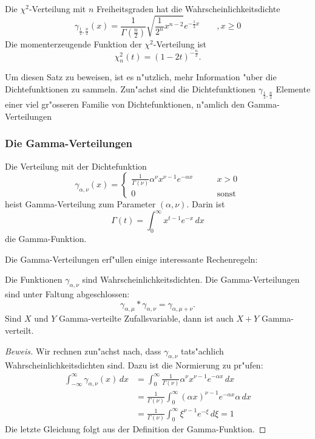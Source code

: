 {\small

\begin{satz}\label{chi2}
Die $\chi^2$-Verteilung mit $n$ Freiheitsgraden hat
die Wahrscheinlichkeitsdichte
\[
\gamma_{\frac12,\frac{n}2}(x)=\frac1{\Gamma(\frac{n}2)}\sqrt{\frac1{2^n}x^{n-2}}e^{-\frac12x}\qquad,x\ge 0
\]
Die momenterzeugende Funktion der $\chi^2$-Verteilung ist
\[
\chi_n^2(t)=(1-2t)^{-\frac{n}2}.
\]
\end{satz}

Um diesen Satz zu beweisen, ist es n"utzlich, mehr Information "uber die
Dichtefunktionen zu sammeln.
Zun"achst sind die Dichtefunktionen
$\gamma_{\frac12,\frac{n}2}$ Elemente einer viel gr"osseren Familie von
Dichtefunktionen, n"amlich den Gamma-Verteilungen

\subsubsection{Die Gamma-Verteilungen}
\begin{definition}
Die Verteilung mit der Dichtefunktion
\[
\gamma_{\alpha,\nu}(x)=\begin{cases}
\displaystyle \frac1{\Gamma(\nu)}\alpha^\nu x^{\nu-1}e^{-\alpha x}&\qquad x>0\\
0&\qquad\text{sonst}
\end{cases}
\]
heist Gamma-Verteilung zum Parameter $(\alpha,\nu)$.
Darin ist
\[
\Gamma(t)=\int_0^\infty x^{t-1}e^{-x}\,dx
\]
die Gamma-Funktion.
\end{definition}

Die Gamma-Verteilungen erf"ullen einige interessante Rechenregeln:
\begin{satz} Die Funktionen $\gamma_{\alpha,\nu}$ sind Wahrscheinlichkeitsdichten.
Die Gamma-Verteilungen sind unter Faltung abgeschlossen:
\[
\gamma_{\alpha,\mu}*\gamma_{\alpha,\nu}=\gamma_{\alpha,\mu+\nu}.
\]
Sind $X$ und $Y$ Gamma-verteilte Zufallsvariable, dann ist auch $X+Y$
Gamma-verteilt.
\end{satz}
\begin{proof}[Beweis]
Wir rechnen zun"achst nach, dass $\gamma_{\alpha,\nu}$ tats"achlich
Wahrscheinlichkeitsdichten sind.
Dazu ist die Normierung zu pr"ufen:
\begin{align*}
\int_{-\infty}^\infty \gamma_{\alpha,\nu}(x)\,dx
&=\int_0^\infty\frac1{\Gamma(\nu)}\alpha^\nu x^{\nu-1}e^{-\alpha x}\,dx\\
&=\frac{1}{\Gamma(\nu)}\int_0^\infty (\alpha x)^{\nu-1}e^{-\alpha x}
\alpha\,dx\\
&=\frac1{\Gamma(\nu)}\int_0^\infty \xi^{\nu-1}e^{-\xi}\,d\xi=1
\end{align*}
Die letzte Gleichung folgt aus der Definition der Gamma-Funktion.


\end{proof}}
